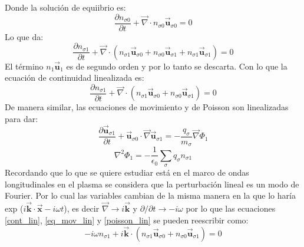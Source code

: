 \documentclass[12pt]{article}
\begin{document}
Donde la solución de equiibrio es:
\begin{equation}
\frac{\partial n_{\sigma 0}}{\partial t} + \overrightarrow{\nabla} \cdot n_{\sigma 0}\overrightarrow{\textbf{u}}_{\sigma 0}=0
\end{equation}
Lo que da:
\begin{equation}
\frac{\partial n_{\sigma 1}}{\partial t}+ \overrightarrow{\nabla} \cdot (n_{\sigma 1} \overrightarrow{\textbf{u}}_{\sigma 0} + n_{\sigma 0} \overrightarrow{\textbf{u}}_{\sigma 1} + n_{\sigma 1} \overrightarrow{\textbf{u}}_{\sigma 1}) =0
\end{equation}
El término $n_1 \overrightarrow{\textbf{u}}_1$ es de segundo orden y por lo tanto se descarta. Con lo que la ecuación de continuidad linealizada es:
\begin{equation}
\label{cont_lin}
\frac{\partial n_{\sigma 1}}{\partial t}+ \overrightarrow{\nabla} \cdot (n_{\sigma 1} \overrightarrow{\textbf{u}}_{\sigma 0} + n_{\sigma 0} \overrightarrow{\textbf{u}}_{\sigma 1}) =0
\end{equation}
De manera similar, las ecuaciones de movimiento y de Poisson son linealizadas para dar:
\begin{equation}
\label{eq_mov_lin}
\frac{\partial \overrightarrow{\textbf{u}}_{\sigma 1}}{\partial t} + \overrightarrow{\textbf{u}}_{\sigma 0} \cdot \overrightarrow{\nabla}\overrightarrow{\textbf{u}}_{\sigma 1} = - \frac{q_{\sigma}}{m_{\sigma}} \overrightarrow{\nabla}\Phi _1
\end{equation}
\begin{equation}
\label{poisson_lin}
\nabla ^2 \Phi _1 = -\frac{1}{\epsilon_0}\sum _{\sigma}q_{\sigma} n_{\sigma 1}
\end{equation}
Recordando que lo que se quiere estudiar está en el marco de ondas longitudinales en el plasma se considera que la perturbación lineal es un modo de Fourier. Por lo cual las variables cambian de la misma manera en la que lo haría exp ($i \overrightarrow{\textbf{k}} \cdot \overrightarrow{\textbf{x}} - i \omega t $), es decir $\overrightarrow{\nabla} \rightarrow i\overrightarrow{\textbf{k}}$ y $\partial / \partial t \rightarrow -i \omega$ por lo que las ecuaciones \ref{cont_lin}, \ref{eq_mov_lin} y \ref{poisson_lin} se pueden reescribir como:
\begin{equation}
\label{cont_fourier}
 -i \omega n_{\sigma 1}+ i\overrightarrow{\textbf{k}} \cdot (n_{\sigma 1} \overrightarrow{\textbf{u}}_{\sigma 0} + n_{\sigma 0} \overrightarrow{\textbf{u}}_{\sigma 1}) =0
\end{equation}
\end{document}
